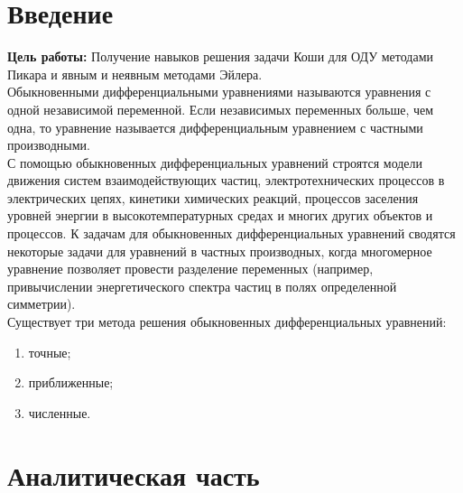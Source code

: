 \documentclass[a4paper, 12pt]{article}
\begin{document}
\section*{Введение}

	\textbf{Цель работы:} Получение навыков решения задачи Коши для ОДУ  методами Пикара и явным и неявным методами Эйлера.
\\	\hspace*{5mm} Обыкновенными дифференциальными уравнениями называются  уравнения с одной  независимой  переменной.  Если независимых переменных больше, чем одна,  то уравнение называется дифференциальным уравнением с частными производными.
	\\ \hspace*{5mm} С помощью обыкновенных дифференциальных уравнений строятся модели движения систем взаимодействующих частиц, электротехнических процессов в электрических цепях,  кинетики химических реакций, процессов заселения уровней  энергии в высокотемпературных средах и многих других объектов и процессов. К задачам  для  обыкновенных  дифференциальных уравнений сводятся некоторые задачи для уравнений в частных производных,  когда многомерное уравнение позволяет провести разделение переменных  (например,  привычислении энергетического спектра частиц в полях определенной  симметрии).
	\\ \hspace*{5mm} Существует три метода решения  обыкновенных дифференциальных уравнений:
	\begin{enumerate}
		\item точные;
		\item приближенные;
		\item численные.
	\end{enumerate}
	

\clearpage
\newpage
\section{Аналитическая часть}
\end{document}

